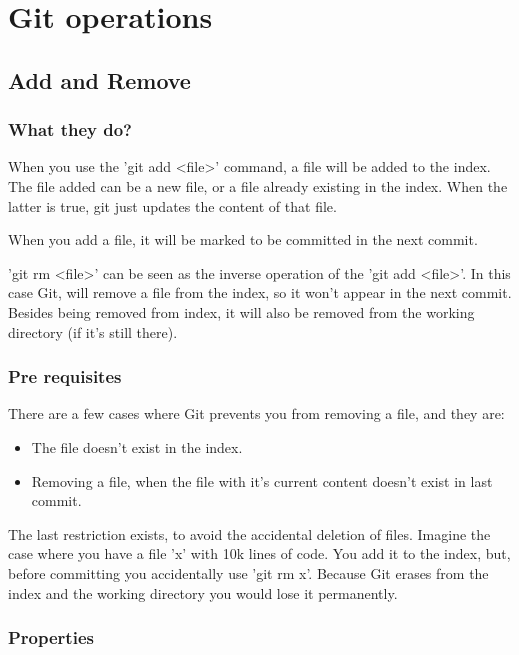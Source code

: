 \section{Git operations}

\subsection{Add and Remove}

\subsubsection{What they do?}

When you use the 'git add <file>' command, a file will be
added to the index. The file added can be a new file, or 
a file already existing in the index. When the latter is true, 
git just updates the content of that file. \par
When you add a file, it will be marked to be committed in the next
commit. \par
'git rm <file>' can be seen as the inverse operation of the 'git add <file>'.
In this case Git, will remove a file from the index, so it won't appear in the
next commit. Besides being removed from index, it will also be removed from the 
working directory (if it's still there). \par

\subsubsection{Pre requisites}

There are a few cases where Git prevents you from removing a file, and they are: 
\begin{itemize}
\item The file doesn't exist in the index.
\item Removing a file, when the file with it's current content 
doesn't exist in last commit.
\end{itemize}
The last restriction exists, to avoid the accidental deletion of files. Imagine the
case where you have a file 'x' with 10k lines of code. You add it to the index,
but, before committing you accidentally use 'git rm x'. Because Git erases from
the index and the working directory you would lose it permanently. \par

\subsubsection{Properties}

